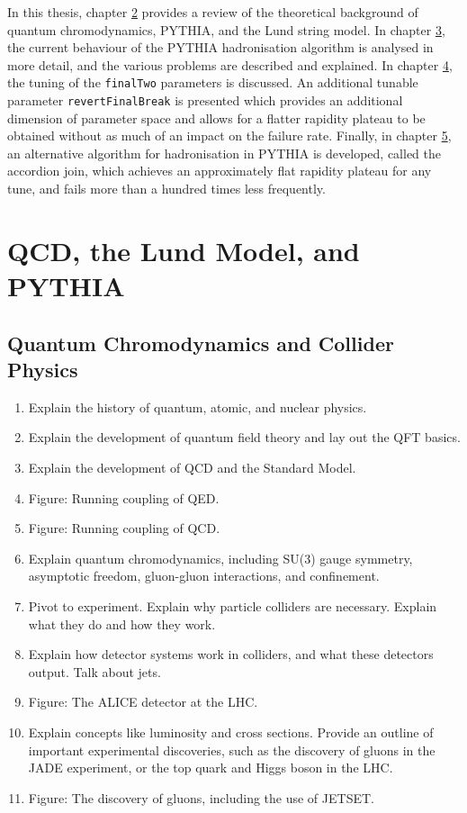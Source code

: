 \documentclass[12pt,a4paper]{report}
\begin{document}
In this thesis, chapter \hyperref[chap:background]{2} provides a review of the theoretical background of quantum chromodynamics, PYTHIA, and the Lund string model. In chapter \hyperref[chap:fragmentation]{3}, the current behaviour of the PYTHIA hadronisation algorithm is analysed in more detail, and the various problems are described and explained. In chapter \hyperref[chap:tuning]{4}, the tuning of the \texttt{finalTwo} parameters is discussed. An additional tunable parameter \texttt{revertFinalBreak} is presented which provides an additional dimension of parameter space and allows for a flatter rapidity plateau to be obtained without as much of an impact on the failure rate. Finally, in chapter \hyperref[chap:accordion]{5}, an alternative algorithm for hadronisation in PYTHIA is developed, called the accordion join, which achieves an approximately flat rapidity plateau for any tune, and fails more than a hundred times less frequently.

\chapter{QCD, the Lund Model, and PYTHIA}
\label{chap:background}
\section{Quantum Chromodynamics and Collider Physics}
\begin{enumerate}
\item Explain the history of quantum, atomic, and nuclear physics.
\item Explain the development of quantum field theory and lay out the QFT basics.
\item Explain the development of QCD and the Standard Model.
\item Figure: Running coupling of QED.
\item Figure: Running coupling of QCD.
\item Explain quantum chromodynamics, including SU(3) gauge symmetry, asymptotic freedom, gluon-gluon interactions, and confinement.
\item Pivot to experiment. Explain why particle colliders are necessary. Explain what they do and how they work.
\item Explain how detector systems work in colliders, and what these detectors output. Talk about jets.
\item Figure: The ALICE detector at the LHC.
\item Explain concepts like luminosity and cross sections. Provide an outline of important experimental discoveries, such as the discovery of gluons in the JADE experiment, or the top quark and Higgs boson in the LHC.
\item Figure: The discovery of gluons, including the use of JETSET.
\end{enumerate}
\end{document}
